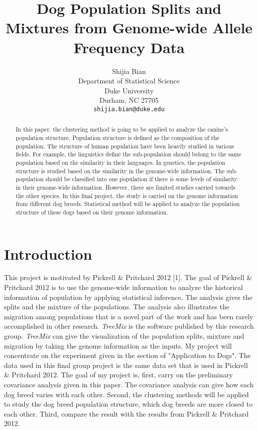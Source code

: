\documentclass{article} %
\title{Dog Population Splits and Mixtures from Genome-wide Allele Frequency Data}
\author{
Shijia Bian \\
Department of Statistical Science\\
Duke University\\
Durham, NC 27705 \\
\texttt{shijia.bian@duke.edu} \\
}
\begin{document}
\maketitle

\begin{abstract}
In this paper, the clustering method is going to be applied to analyze the canine's population structure. Population structure is defined as the composition of the population. The structure of human population have been heavily studied in various fields. For example, the linguistics define the sub-population should belong to the same population based on the similarity in their languages. In genetics, the population structure is studied based on the similarity in the genome-wide information. The sub-population should be classified into one population if there is some levels of similarity in their genome-wide information. However, there are limited studies carried towards the other species. In this final project, the study is carried on the genome information from different dog breeds. Statistical method will be applied to analyze the population structure of these dogs based on their genome information. 
\end{abstract}

\section{Introduction}

This project is motivated by Pickrell \& Pritchard 2012 [1]. The goal of Pickrell \& Pritchard 2012 is to use the genome-wide information to analyze the historical information of population by applying statistical inference. The analysis gives the splits and the mixture of the populations. The analysis also illustrates the migration among populations that is a novel part of the work and has been rarely accomplished in other research. {\it TreeMix} is the software published by this research group. {\it TreeMix} can give the visualization of the population splits, mixture and migration by taking the genome information as the inputs. My project will concentrate on the experiment given in the section of "Application to Dogs". The data used in this final group project is the same data set that is used in Pickrell \& Pritchard 2012. The goal of my project is, first, carry on the preliminary covariance analysis given in this paper. The covariance analysis can give how each dog breed varies with each other. Second, the clustering methods will be applied to study the dog breed population structure, which dog breeds are more closed to each other. Third, compare the result with the results from Pickrell \& Pritchard 2012.
  
\end{document}
